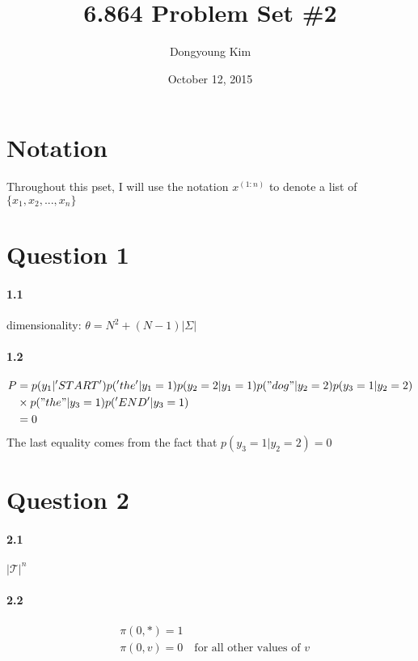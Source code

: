\documentclass[10pt,letter]{article}
\begin{document}

\title{6.864 Problem Set \#2}

\author{Dongyoung Kim}

\date{October 12, 2015}
 
\maketitle 

\section*{Notation}
Throughout this pset, I will use the notation $x^{(1:n)}$ to denote a list of $\{ x_1, x_2, ..., x_n \}$

\section*{Question 1}

\paragraph*{1.1}
dimensionality: $\theta = N^2 + (N-1)|\Sigma|$


\paragraph*{1.2}
\begin{align*}
P &= p(y_1|'START')p('the'|y_1=1)p(y_2=2|y_1=1)p("dog"|y_2=2)p(y_3=1|y_2=2) \\
&\times p("the"|y_3=1)p('END'|y_3=1) \\
&= 0
\end{align*}
The last equality comes from the fact that $p(y_3=1|y_2=2) = 0$

\section*{Question 2}

\paragraph*{2.1}
$|\mathcal{T}|^n$

\paragraph*{2.2}
\begin{align*}
&\pi(0,*) = 1 \\
&\pi(0,v) = 0  \quad\text{for all other values of $v$}
\end{align*}
\end{document}

